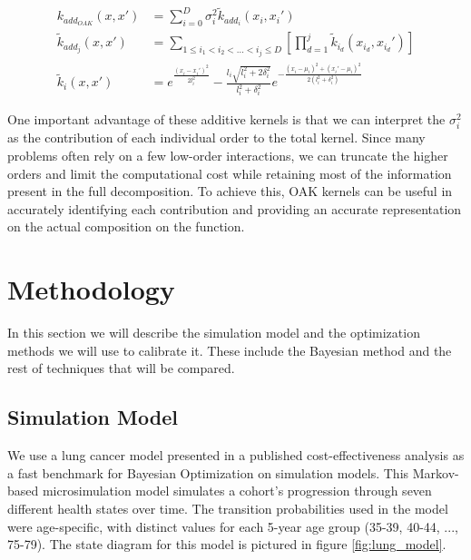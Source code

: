 \documentclass{IOS-Book-Article}
\begin{document}
\begin{equation} \label{eq:additive-orthogonal}
	\begin{aligned}
		k_{add_{OAK}}(x,x') &= \sum_{i=0}^D{\sigma_i^2  \tilde{k}_{add_i}(x_i,x_i')} \\
		\tilde{k}_{add_j}(x,x') &= \sum_{1\leq i_1 < i_2 < \ldots < i_j\leq D} \left[\prod_{d=1}^{j} \tilde{k}_{i_d}(x_{i_d},x_{i_d}') \right]\\		
		\tilde{k}_i(x,x') &= e^{\frac{(x_i-x_i')^2}{2l_i^2}} - \frac{l_i\sqrt{l_i^2 + 2\delta_i^2}}{l_i^2 + \delta_i^2} e^{-\frac{(x_i-\mu_i)^2 + (x_i'-\mu_i)^2}{2(l_i^2 + \delta_i^2)}}
	\end{aligned}
\end{equation}
	
One important advantage of these additive kernels is that we can interpret the $\sigma_i^2$ as the contribution of each individual order to the total kernel. Since many problems often rely on a few low-order interactions, we can truncate the higher orders and limit the computational cost while retaining most of the information present in the full decomposition. To achieve this, OAK kernels can be useful in accurately identifying each contribution and providing an accurate representation on the actual composition on the function.

\section{Methodology}
In this section we will describe the simulation model and the optimization methods we will use to calibrate it. These include the Bayesian method and the rest of techniques that will be compared.

\subsection{Simulation Model}
\label{sec:simulation-model}
We use a lung cancer model presented in a published cost-effectiveness analysis\cite{lung-model} as a fast benchmark for Bayesian Optimization on simulation models. This Markov-based microsimulation model simulates a cohort's progression through seven different health states over time. The transition probabilities used in the model were age-specific, with distinct values for each 5-year age group (35-39, 40-44, ..., 75-79). The state diagram for this model is pictured in figure \ref{fig:lung_model}.
\end{document}
